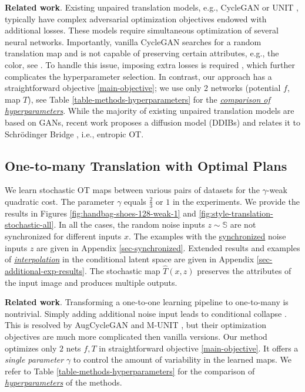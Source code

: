\documentclass{article} %
\begin{document}
\vspace{-1mm}\textbf{Related work}. Existing unpaired translation models, e.g., CycleGAN \citep{zhu2017unpaired} or UNIT \citep{liu2017unsupervised}, typically have complex adversarial optimization objectives endowed with additional losses. These models require simultaneous optimization of several neural networks. Importantly, vanilla CycleGAN searches for a random translation map and is not capable of preserving certain attributes, e.g., the color, see \citep[Figure 5b]{lu2019guiding}. To handle this issue, imposing extra losses is required \citep{benaim2017one,kim2017learning}, which further complicates the hyperparameter selection. In contrast, our approach has a straightforward objective \eqref{main-objective}; we use only 2 networks (potential $f$, map $T$), see Table \ref{table-methods-hyperparameters} for the \underline{\textit{comparison of hyperparameters}}. While the majority of existing unpaired translation models are based on GANs, recent work \citep{su2023dual} proposes a diffusion model (DDIBs) and relates it to Schrödinger Bridge \citep{leonard2014survey}, i.e., entropic OT.

\vspace{-2.5mm}\subsection{One-to-many Translation with Optimal Plans}
\label{sec-one-to-many-translation}

\vspace{-2mm}We learn stochastic OT maps between various pairs of datasets for the $\gamma$-weak quadratic cost. The parameter $\gamma$ equals $\frac{2}{3}$ or $1$ in the experiments. We provide the results in Figures \ref{fig:handbag-shoes-128-weak-1} and \ref{fig:style-translation-stochastic-all}.
In all the cases, the random noise inputs $z\sim \mathbb{S}$ are not synchronized for different inputs $x$. The examples with the \underline{synchronized} noise inputs $z$ are given in Appendix \ref{sec-synchronized}.
Extended results and examples of \underline{\textit{interpolation}} in the conditional latent space are given in Appendix \ref{sec-additional-exp-results}. The stochastic map $\widehat{T}(x,z)$ preserves the attributes of the input image and produces multiple outputs. 

\vspace{-0.5mm}\textbf{Related work}. Transforming a one-to-one learning pipeline to one-to-many is nontrivial. Simply adding additional noise input leads to conditional collapse \citep{zhang2018xogan}. This is resolved by AugCycleGAN \citep{almahairi2018augmented} and M-UNIT \citep{huang2018multimodal}, but their optimization objectives are much more complicated then vanilla versions. Our method optimizes only $2$ nets $f,T$ in straightforward objective \eqref{main-objective}. It offers a \textit{single parameter} $\gamma$ to control the amount of variability in the learned maps. We refer to Table \ref{table-methods-hyperparameters} for the comparison of \underline{\textit{hyperparameters}} of the methods. 
\end{document}
